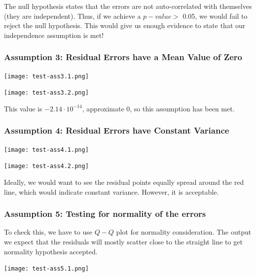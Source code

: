 \tab The null hypothesis states that the errors are not auto-correlated with themselves (they are independent). Thus, if we achieve a $p-value >$ 0.05, we would fail to reject the null hypothesis. This would give us enough evidence to state that our independence assumption is met!

\subsubsection{Assumption 3: Residual Errors have a Mean Value of Zero}

\begin{center}
    \texttt{[image: test-ass3.1.png]}
\end{center}

\begin{center}
    \texttt{[image: test-ass3.2.png]}
\end{center}

\tab  This value is $-2.14\cdot 10^{-14}$, approximate 0, so this assumption has been met. 

\subsubsection{Assumption 4: Residual Errors have Constant Variance}

\begin{center}
    \texttt{[image: test-ass4.1.png]}
\end{center}

\begin{center}
    \texttt{[image: test-ass4.2.png]}
\end{center}

\tab Ideally, we would want to see the residual points equally spread around the red line, which would indicate constant variance. However, it is acceptable. 

\subsubsection{Assumption 5: Testing for normality of the errors}

\tab To check this, we have to use $Q-Q$ plot for normality consideration. The output we expect that the residuals will mostly scatter close to the straight line to get normality hypothesis accepted. 

\begin{center}
    \texttt{[image: test-ass5.1.png]}
\end{center}

